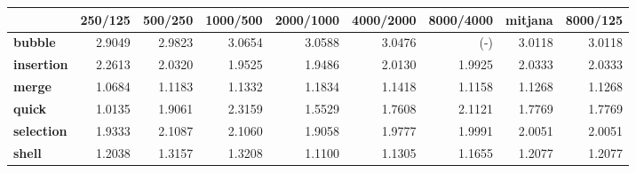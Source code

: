 \begin{tabular}{lrrrrrrrr}
\toprule
{} &  250/125 &  500/250 &  1000/500 &  2000/1000 &  4000/2000 &  8000/4000 &  mitjana &  8000/125 \\
\midrule
\textbf{bubble   } &   2.9049 &   2.9823 &    3.0654 &     3.0588 &     3.0476 &        (-) &   3.0118 &    3.0118 \\
\textbf{insertion} &   2.2613 &   2.0320 &    1.9525 &     1.9486 &     2.0130 &     1.9925 &   2.0333 &    2.0333 \\
\textbf{merge    } &   1.0684 &   1.1183 &    1.1332 &     1.1834 &     1.1418 &     1.1158 &   1.1268 &    1.1268 \\
\textbf{quick    } &   1.0135 &   1.9061 &    2.3159 &     1.5529 &     1.7608 &     2.1121 &   1.7769 &    1.7769 \\
\textbf{selection} &   1.9333 &   2.1087 &    2.1060 &     1.9058 &     1.9777 &     1.9991 &   2.0051 &    2.0051 \\
\textbf{shell    } &   1.2038 &   1.3157 &    1.3208 &     1.1100 &     1.1305 &     1.1655 &   1.2077 &    1.2077 \\
\bottomrule
\end{tabular}
